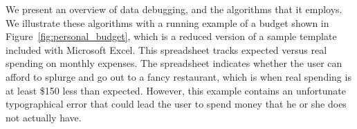 


We present an overview of data debugging, and the algorithms that it employs.
We illustrate these algorithms with a running example of a budget shown in
Figure~\ref{fig:personal_budget}, which is a reduced version of a sample
template included with Microsoft Excel. This spreadsheet tracks expected
versus real spending on monthly expenses. The spreadsheet indicates whether
the user can afford to splurge and go out to a fancy restaurant, which is when
real spending is at least \$150 less than expected. However, this example
contains an unfortunate typographical error that could lead the user to spend
money that he or she does not actually have.

